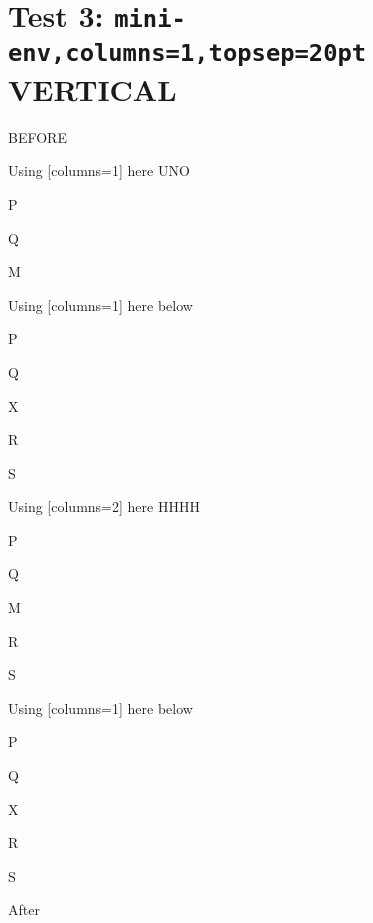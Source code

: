 \documentclass[12pt]{article}
\begin{document}
\section{Test 3: \texttt{mini-env,columns=1,topsep=20pt} VERTICAL}

BEFORE
\begin{enumext}[columns=2]
\item Using [columns=1] here UNO

  \begin{enumext}[columns=1,topsep=20pt]%
     \item  P \item Q \item M %
  \end{enumext}

\item Using [columns=1] here below

\begin{enumext}[columns=1,topsep=20pt]%
     \item  P \item Q \item X  \item R \item S
  \end{enumext}

\columnbreak

\item Using [columns=2] here HHHH

  \begin{enumext}[columns=2,topsep=20pt]%
    \item  P \item Q \item M \item R \item S
  \end{enumext}

\item Using [columns=1] here below

\begin{enumext}[columns=1,topsep=20pt]%
     \item  P \item Q \item X  \item R \item S
  \end{enumext}

\end{enumext}
After
\end{document}
